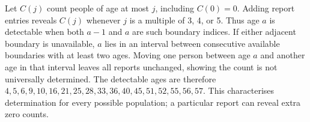 Let $C(j)$ count people of age at most $j$, including $C(0)=0$. Adding report entries reveals $C(j)$ whenever $j$ is a multiple of 3, 4, or 5. Thus age $a$ is detectable when both $a-1$ and $a$ are such boundary indices. If either adjacent boundary is unavailable, $a$ lies in an interval between consecutive available boundaries with at least two ages. Moving one person between age $a$ and another age in that interval leaves all reports unchanged, showing the count is not universally determined. The detectable ages are therefore $\boxed{4,5,6,9,10,16,21,25,28,33,36,40,45,51,52,55,56,57}$. This characterises determination for every possible population; a particular report can reveal extra zero counts.
